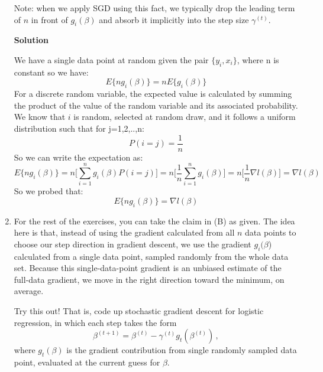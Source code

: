 \documentclass[11 pt]{article}
\begin{document}
\begin{enumerate}[label=(\Alph*)]
	Note: when we apply SGD using this fact, we typically drop the leading term of $n$ in front of $g_i(\beta)$ and absorb it implicitly into the step size $\gamma^{(t)}$.
	
	
	\vspace{2mm}
	\textbf{Solution}
	
	We have a single data point at random given the pair $\{y_i, x_i\}$, where n is constant so we have:
	$$	E \{ n g_i(\beta) \} = n E \{g_i(\beta) \} $$
	For a discrete random variable, the expected value is calculated by summing the product of the value of the random variable and its associated probability. We know that $i$ is random, selected at random draw, and it follows a uniform distribution such that for j={1,2,..,n}:
	$$ P(i=j)= \frac{1}{n} $$
	So we can write the expectation as:
	$$	E \{ n g_i(\beta) \} =  n \bigg[\sum_{i=1}^n g_i(\beta) P(i=j)  \bigg] = n \bigg[\frac{1}{n}\sum_{i=1}^n g_i(\beta)   \bigg] = n \bigg[\frac{1}{n}\nabla l(\beta)\bigg]= \nabla l(\beta) $$
	So we probed that:
	$$	E \{ n g_i(\beta) \} = \nabla l(\beta)$$
	
	
	
	
	
	\newpage
	
	
	\item For the rest of the exercises, you can take the claim in (B) as given.  The idea here is that, instead of using the gradient calculated from all $n$ data points to choose our step direction in gradient descent, we use the gradient $g_i(\beta$) calculated from a single data point, sampled randomly from the whole data set.  Because this single-data-point gradient is an unbiased estimate of the full-data gradient, we move in the right direction toward the minimum, on average.
	
	Try this out!  That is, code up stochastic gradient descent for logistic regression, in which each step takes the form
	$$
	\beta^{(t+1)} = \beta^{(t)} - \gamma^{(t)} g_t (\beta^{(t)}) \, ,
	$$
	where $g_t (\beta)$ is the gradient contribution from single randomly sampled data point, evaluated at the current guess for $\beta$.
	

\end{enumerate}
\end{document}
